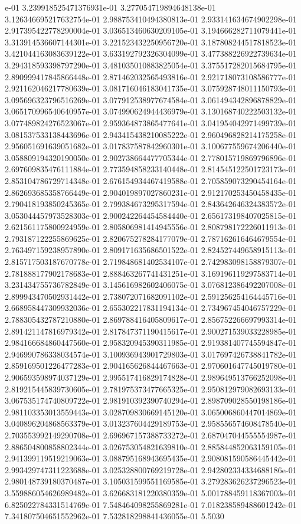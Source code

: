 e-01	3.239918525471376931e-01	3.277054719894648138e-01	3.126346695217632754e-01	2.988753410494380813e-01	2.933141634674902298e-01	2.917395422778290004e-01	3.036513460630209105e-01	3.194666282711079441e-01	3.313914536607144301e-01	3.221523432250956720e-01	3.187808244517818523e-01	3.421044163083639122e-01	3.633192792326304099e-01	3.477388226922739634e-01	3.294318593398797290e-01	3.481035010883825054e-01	3.375517282015684795e-01	2.890999417845866448e-01	2.871462032565493816e-01	2.921718073108586777e-01	2.921162046217780639e-01	3.081716046183041735e-01	3.075928748011150793e-01	3.095696323796516269e-01	3.077912538977674584e-01	3.061494342896878829e-01	3.065170996540640957e-01	3.074990624944436979e-01	3.130168740222503132e-01	3.077489824276523067e-01	2.959364873865477641e-01	3.041954042971499739e-01	3.081537533138443696e-01	2.943415438210085222e-01	2.960496828214175258e-01	2.956051691639051682e-01	3.017837587842960301e-01	3.100677559674206440e-01	3.058809194320190050e-01	2.902738664477705344e-01	2.778015719869796896e-01	2.697609835476111884e-01	2.773594858233140448e-01	2.814545122501723173e-01	2.853104786729714348e-01	2.676154934467419588e-01	2.705859073290454164e-01	2.862693685358766449e-01	2.904019897027860231e-01	2.912170253450458435e-01	2.790418193850245365e-01	2.799384673295317594e-01	2.843642646324383572e-01	3.053044457973528303e-01	2.900242264454584440e-01	2.656173198407025815e-01	2.621561175800924959e-01	2.805806981414945556e-01	2.808798172226011913e-01	2.793187122255869625e-01	2.820675278284177079e-01	2.787162616464679554e-01	2.763497159238957890e-01	2.809171635686501522e-01	2.824527449658915113e-01	2.815717503187670778e-01	2.719848681402534107e-01	2.742983098158879307e-01	2.781888177902178683e-01	2.888463267741431251e-01	3.169196119297583714e-01	3.231434755736782849e-01	3.145616982602406075e-01	3.076812386492207008e-01	2.899943470502931442e-01	2.738072071682091102e-01	2.591256254164445716e-01	2.668958447309932036e-01	2.655302217831194134e-01	2.734967454046757229e-01	2.788305432787210880e-01	2.869788416405809617e-01	2.856752266697993314e-01	2.891421147816979342e-01	2.817847371190415617e-01	2.900271539033228985e-01	2.984166684860447560e-01	2.958320945390311985e-01	2.919381407745594847e-01	2.946990786338034574e-01	3.100936943901729803e-01	3.017697426738841782e-01	2.859169501226477283e-01	2.904165626844467663e-01	2.970601647745019780e-01	2.906593598974037129e-01	2.995517416829174828e-01	2.989649513766252098e-01	2.819215445839730605e-01	2.781975373477665325e-01	2.950812979082693133e-01	3.067535174740809722e-01	2.981910392390740294e-01	2.898709028550198186e-01	2.981103353013559443e-01	3.028709830669145120e-01	3.065006860447014869e-01	3.040896204868563379e-01	3.013237604429189753e-01	2.958556574608478540e-01	2.703553992149290708e-01	2.696967157388733272e-01	2.687047044555554987e-01	2.886504800858802344e-01	3.026753054821639810e-01	2.885844852063159105e-01	2.941399119519219063e-01	3.088795168943695435e-01	2.908081590586445442e-01	2.993429747311223688e-01	3.025328800769219728e-01	2.942802334334688186e-01	2.980148739180370487e-01	3.105031599551169585e-01	3.279283626237296523e-01	3.559886054626989482e-01	3.626683181220380359e-01	5.001788459118367003e-01	6.825022784331514769e-01	7.548464098255869281e-01	7.018238589488601242e-01	7.341807504651552962e-01	7.532818298841436055e-01	5.5030